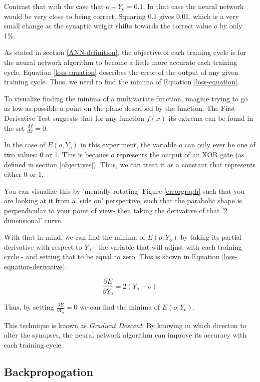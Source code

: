 \documentclass[12pt]{article}
\begin{document}
        Contrast that with the case that $o - Y_o = 0.1$, In that case the neural network would be very close to being correct. Squaring 0.1 gives 0.01, which is a very small change as the synaptic weight shifts towards the correct value $o$ by only 1\%.

        As stated in section \ref{ANN-definition}, the objective of each training cycle is for the neural network algorithm to become a little more accurate each training cycle. Equation \ref{loss-equation} describes the error of the output of any given training cycle. Thus, we need to find the minima of Equation \ref{loss-equation}.
        
        To visualize finding the minima of a multivariate function, imagine trying to go as low as possible a point on the plane described by the function. The First Derivative Test suggests that for any function $f(x)$ its extrema can be found in the set $\frac{df}{dx} = 0$. 

        In the case of \(E(o, Y_o)\) in this experiment, the variable $o$ can only ever be one of two values: 0 or 1. This is becaues $o$ represents the output of an XOR gate (as defined in section \ref{objectives}). Thus, we can treat it as a constant that represents either 0 or 1.

        You can visualize this by 'mentally rotating' Figure \ref{errorgraph} such that you are looking at it from a 'side on' perspective, such that the parabolic shape is perpendicular to your point of view- then taking the derivative of that '2 dimensional' curve.
        
        With that in mind, we can find the minima of $E(o, Y_o)$ by taking its partial derivative with respect to $Y_o$ - the variable that will adjust with each training cycle -  and setting that to be equal to zero. This is shown in Equation \ref{loss-equation-derivative}. 

        \begin{equation} \label{loss-equation-derivative}
            \frac{\partial E}{\partial Y_o} = 2 (Y_o  - o)
        \end{equation}

        Thus, by setting $\frac{\partial E}{\partial Y_o} = 0$ we can find the minima of $E(o, Y_o)$.

        This technique is known as \textit{Gradient Descent}. By knowing in which directon to alter the synapses, the neural network algorithm can improve its accuracy with each training cycle.

    \subsection{Backpropogation \label{backprop}}
\end{document}
